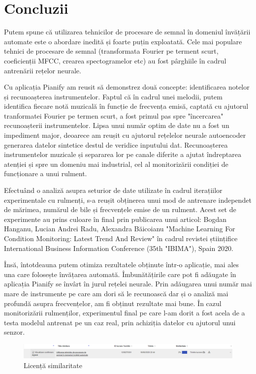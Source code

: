 \documentclass[a4paper,12pt]{report}
\begin{document}
   \clearpage 	
   \section{Concluzii} 
   		Putem spune că utilizarea tehnicilor de procesare de semnal în domeniul învățării automate este o abordare inedită și foarte puțin exploatată. Cele mai populare tehnici de procesare de semnal (transformata Fourier pe terment scurt, coeficienții MFCC, crearea spectogramelor etc) au fost pârghiile în cadrul antrenării rețelor neurale.
   		
   		Cu aplicația Pianify am reusit să demonstrez două concepte: identificarea notelor și recunoașterea instrumentelor. Faptul că în cadrul unei melodii, putem identifica fiecare notă muzicală în funcție de frecvența emisă, captată cu ajutorul tranformatei Fourier pe termen scurt, a fost primul pas spre "încercarea" recunoașterii instrumentelor. Lipsa unui număr optim de date nu a fost un impediment major, deoarece am reușit cu ajutorul rețelelor neurale autoencoder generarea datelor sintetice destul de veridice inputului dat. Recunoașterea instrumentelor muzicale și separarea lor pe canale diferite a ajutat îndreptarea atenției și spre un domeniu mai industrial, cel al monitorizării condiției de funcționare a unui rulment.
   		
   		Efectuând o analiză asupra seturior de date utilizate în cadrul iterațiilor experimentale cu rulmenți, s-a reușit obținerea unui mod de antrenare independet de mărimea, numărul de bile și frecvențele emise de un rulment. Acest set de experimente au prins culoare în final prin publicarea unui articol: Bogdan Hanganu, Lucian Andrei Radu, Alexandra Băicoianu "Machine Learning For Condition Monitoring: Latest Trend And Review" în cadrul revistei științifice International Business Information Conference (35th "IBIMA"), Spain 2020.
   		
   		Însă, întotdeauna putem otimiza rezultatele obținute într-o aplicație, mai ales una care folosește învățarea automată. Îmbunătățirile care pot fi adăugate în aplicația Pianify se învârt în jurul rețelei neurale. Prin adăugarea unui număr mai mare de instrumente pe care am dori să le recunoască dar și o analiză mai profundă asupra frecvențelor, am fi obținut rezultate mai bune. În cazul monitorizării rulmenților, experimentul final pe care l-am dorit a fost acela de a testa modelul antrenat pe un caz real, prin achiziția datelor cu ajutorul unui senzor.
   \clearpage
   \printbibliography
   \clearpage
	\begin{figure}[H]
		\begin{center}
			\includegraphics[scale=0.4]{images/plagiat.PNG}
		\end{center}
		\caption{Licență similaritate}
		\label{fig:sim}
	\end{figure} 	
\end{document}

